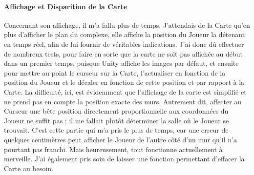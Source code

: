 \documentclass{article}
\begin{document}
\paragraph{Affichage et Disparition de la Carte}
Concernant son affichage, il m'a fallu plus de temps. J'attendais de la Carte qu'en plus d'afficher le plan du complexe, elle affiche la position du Joueur la détenant en temps réel, afin de lui fournir de véritables indications. J'ai donc dû effectuer de nombreux tests, pour faire en sorte que la carte ne soit pas affichée au début dans un premier temps, puisque Unity affiche les images par défaut, et ensuite pour mettre au point le curseur sur la Carte, l'actualiser en fonction de la position du Joueur et le décaler en fonction de cette position et par rapport à la Carte. La difficulté, ici, est évidemment que l'affichage de la carte est simplifié et ne prend pas en compte la position exacte des murs. Autrement dit, affecter au Curseur une bête position directement proportionnelle aux coordonnées du Joueur ne suffit pas ; il me fallait plutôt déterminer la salle où le Joueur se trouvait. C'est cette partie qui m'a pris le plus de temps, car une erreur de quelques centimètres peut afficher le Joueur de l'autre côté d'un mur qu'il n'a pourtant pas franchi. Mais heureusement, tout fonctionne actuellement à merveille. J'ai également pris soin de laisser une fonction permettant d'effacer la Carte au besoin.
\end{document}
